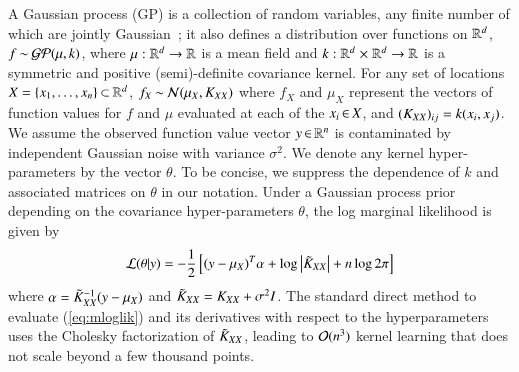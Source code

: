 A Gaussian process (GP) is a collection of random variables, any finite number
of which are jointly Gaussian~\citep{rasmussen06}; it also defines a
distribution over functions on $\mathbb{R}^d$, $f \mathbin{\sim} \mathcal{GP}(\mu,k)$, where $\mu :
\mathbb{R}^d \to \mathbb{R}$ is a mean field and $k : \mathbb{R}^d \mathrel{\times} \mathbb{R}^d \to \mathbb{R}$ is a
symmetric and positive (semi)-definite covariance kernel. For any set of
locations $X = \{x_1,\ldots,x_n\} \mathbin{\subset} \mathbb{R}^d$, $f_X \mathbin{\sim} \mathcal{N}(\mu_X, K_{XX})$ where $f_X$ and $\mu_X$ represent the vectors of function values for $f$
and $\mu$ evaluated at each of the $x_i \operatorname{\in} X$, and $(K_{XX})_{ij} = k(x_i,
x_j)$.  We assume the observed function value vector $y \operatorname{\in} \mathbb{R}^n$ is
contaminated by independent Gaussian noise with variance $\sigma^2$. We denote
any kernel hyper\hyp{}parameters by the vector $\theta$. To be concise, we
suppress the dependence of $k$ and associated matrices on $\theta$ in our
notation. Under a Gaussian process prior depending on the covariance
hyper\hyp{}parameters $\theta$, the log marginal likelihood is
given by
\begin{equation}\label{eq:mloglik}
  \mathcal{L}(\theta|y) = -\frac{1}{2}\left[(y-\mu_X)^T\alpha + \log\left\lvert\tilde{K}_{XX}\right\rvert +
  n\log 2\pi\right]
\end{equation}
where $\alpha = \tilde{K}_{XX}^{-1}(y-\mu_X)$ and $\tilde{K}_{XX} = K_{XX} + \sigma^2 I$.
The standard direct method to evaluate (\ref{eq:mloglik}) and its derivatives
with respect to the hyperparameters uses the Cholesky factorization of $
\tilde{K}_{XX}$, leading to $\mathcal{O}(n^3)$ kernel learning that does not scale beyond a
few thousand points.

